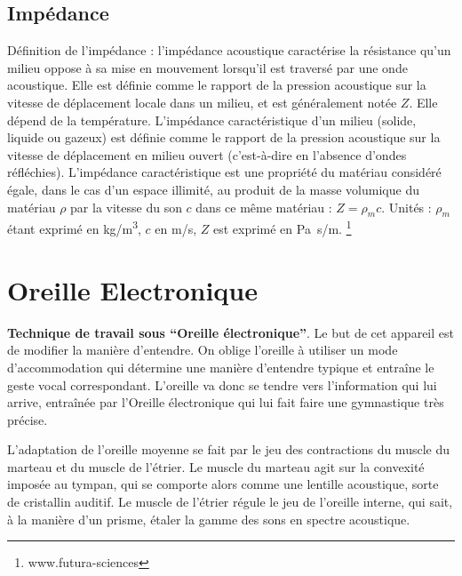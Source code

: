 \subsection{Impédance}
\label{impedance}
Définition de l'impédance : l'impédance acoustique
caractérise la résistance qu'un milieu oppose à sa mise en mouvement
lorsqu'il est traversé par une onde acoustique. Elle est définie comme
le rapport de la pression acoustique sur la vitesse de déplacement
locale dans un milieu, et est généralement notée $Z$. Elle dépend de
la température. L'impédance caractéristique d'un milieu (solide, liquide
ou gazeux) est définie comme le rapport de la pression acoustique
sur la vitesse de déplacement en milieu ouvert (c'est-à-dire
en l'absence d'ondes réfléchies). L'impédance caractéristique est
une propriété du matériau considéré égale, dans le cas d'un espace
illimité, au produit de la masse volumique du matériau $\rho$
par la vitesse du son $c$ dans ce même matériau : $Z = \rho_{m} c$.
Unités : $\rho_{m}$ étant exprimé en \si{kg/m\cubed},
$c$ en \si{m/s}, $Z$ est
exprimé en \si{\pascal . s/m}. \footnote{www.futura-sciences}




\section{Oreille Electronique}
\label{oreilleelectronique}


\textbf{Technique de travail sous ``Oreille électronique''}.
Le but de cet appareil
est de modifier la manière d'entendre. On oblige l'oreille à utiliser
un mode d'accommodation qui
détermine une manière d'entendre typique et entraîne le geste
vocal correspondant.
L'oreille va donc se tendre
vers l'information qui lui arrive, entraînée par l'Oreille
électronique qui lui fait faire une
gymnastique très précise.

 L'adaptation de l'oreille moyenne se fait par le jeu des contractions
du muscle du marteau et du muscle de l'étrier.
 Le muscle du marteau agit sur la convexité imposée au tympan, qui
se comporte alors comme une lentille acoustique, sorte de cristallin
auditif.
Le muscle de l'étrier régule le jeu de l'oreille interne, qui sait,
à la manière d'un prisme, étaler la gamme des sons en spectre acoustique.

